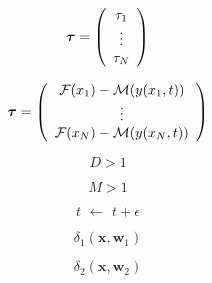 \documentclass[10pt,twoside]{book}
\newcommand{\bldgr}[1]{{\mbox{\boldmath {${#1}$}}}} %
\newcommand{\fat}[1]{\mathbf{#1}} %
\begin{document}
$$
\bldgr{\tau} 
= 
\left(
\begin{array}{c}
\tau_1 \\
\vdots \\
\tau_N
\end{array}
\right)
$$

$$
\bldgr{\tau} 
= 
\left(
\begin{array}{c}
\mathcal{F}( x_1 ) - \mathcal{M}( y( x_1, t ) ) \\
\vdots \\
\mathcal{F}( x_N ) - \mathcal{M}( y( x_N, t ) )
\end{array}
\right)
$$

$$
D > 1
$$

$$
M > 1
$$

$$
t 
\,\,
\gets 
\,\,
t + \epsilon
$$

$$
\delta_1(\fat{x}, \fat{w}_1)
$$

$$
\delta_2(\fat{x}, \fat{w}_2)
$$
\end{document}
